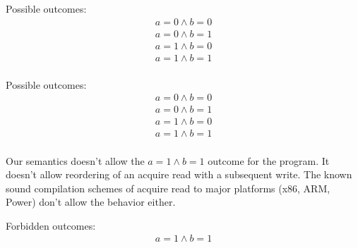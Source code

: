 \begin{minipage}[t]{0.3\linewidth}
Possible outcomes:\\
\[\begin{array}{l}
a = 0 \land b = 0\\
a = 0 \land b = 1\\
a = 1 \land b = 0\\
a = 1 \land b = 1\\
\end{array}\]
\end{minipage}
%
\lbTemplate{\rlx}{\rlx}{\rlx}{\rel}{\rlx}{\rel}
\litmusTestEnd

\begin{minipage}[t]{0.3\linewidth}
Possible outcomes:\\
\[\begin{array}{l}
a = 0 \land b = 0\\
a = 0 \land b = 1\\
a = 1 \land b = 0\\
a = 1 \land b = 1\\
\end{array}\]
\end{minipage}
%
\lbTemplate{\rlx}{\rlx}{\acq}{\rlx}{\acq}{\rlx}

Our semantics doesn't allow the $a = 1 \land b = 1$ outcome for the program.
It doesn't allow reordering of an acquire read with a subsequent write.
The known sound compilation schemes of acquire read to major platforms (x86, ARM, Power) don't
allow the behavior either. 

\litmusTestEnd

\begin{minipage}[t]{0.3\linewidth}
Forbidden outcomes:\\
\[\begin{array}{l}
a = 1 \land b = 1\\
\end{array}\]
\end{minipage}
%
\lbTemplate{\rlx}{\rlx}{\acq}{\rlx}{\rlx}{\rel}
\litmusTestEnd

